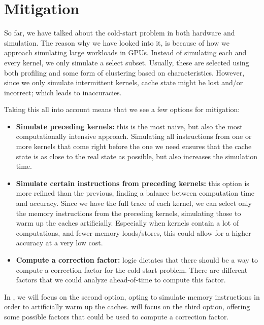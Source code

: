 \chapter{Mitigation}\label{ch:mitigation}

So far, we have talked about the cold-start problem in both hardware and simulation.
The reason why we have looked into it, is because of how we approach simulating large workloads in GPUs.
Instead of simulating each and every kernel, we only simulate a select subset.
Usually, these are selected using both profiling and some form of clustering based on characteristics.
However, since we only simulate intermittent kernels, cache state might be lost and/or incorrect; which leads to inaccuracies.

Taking this all into account means that we see a few options for mitigation:
\begin{itemize}
    \item \textbf{Simulate preceding kernels:} this is the most naive, but also the most computationally intensive approach.
    Simulating all instructions from one or more kernels that come right before the one we need ensures that the cache state is as close to the real state as possible, but also increases the simulation time.
    \item \textbf{Simulate certain instructions from preceding kernels:} this option is more refined than the previous, finding a balance between computation time and accuracy.
    Since we have the full trace of each kernel, we can select only the memory instructions from the preceding kernels, simulating those to warm up the caches artificially.
    Especially when kernels contain a lot of computations, and fewer memory loads/stores, this could allow for a higher accuracy at a very low cost.
    \item \textbf{Compute a correction factor:} logic dictates that there should be a way to compute a correction factor for the cold-start problem.
    There are different factors that we could analyze ahead-of-time to compute this factor.
\end{itemize}

In , we will focus on the second option, opting to simulate memory instructions in order to artificially warm up the caches.
 will focus on the third option, offering some possible factors that could be used to compute a correction factor.

\FloatBarrier
